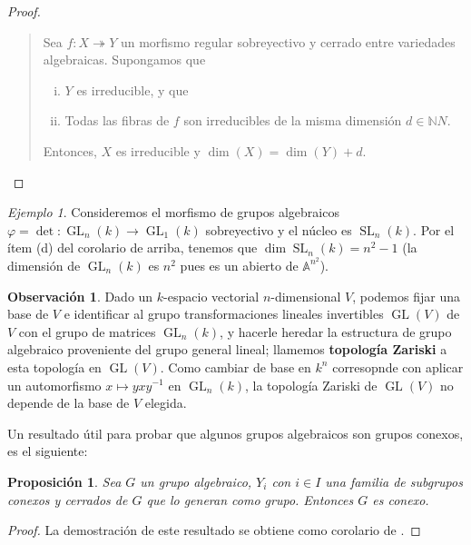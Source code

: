 \documentclass[spanish,10pt]{amsart}
\newtheorem{proposition}[theorem]{Proposición}
\theoremstyle{definition}
\newtheorem{obs}[theorem]{Observación}
\theoremstyle{remark}
\newtheorem{example}[theorem]{Ejemplo}
\numberwithin{equation}{section}
\newcommand{\afine}[1]{\mathbb{A}^{#1}}
\newcommand{\naturals}{\mathbb{N}}
\begin{document}
\begin{proof}
\begin{enumerate}[(a)]
\begin{quote}
Sea $f : X \twoheadrightarrow Y$ un morfismo regular sobreyectivo y cerrado entre variedades algebraicas. Supongamos que
\begin{enumerate}[(i)]
\item $Y$ es irreducible, y que
\item Todas las fibras de $f$ son irreducibles de la misma dimensión $d \in \naturals N$.
\end{enumerate}
Entonces, $X$ es irreducible y $\dim (X) = \dim (Y) + d$.
\end{quote}
\end{enumerate}
\end{proof}

\begin{example}
Consideremos el morfismo de grupos algebraicos $\varphi = \det : \operatorname{GL}_n (k) \to \operatorname{GL}_{1} (k)$ sobreyectivo y el núcleo es $\operatorname{SL}_n (k)$. Por el ítem (d) del corolario de arriba, tenemos que $\dim \operatorname{SL}_n (k) = n^2 -1$ (la dimensión de $\operatorname{GL}_n (k)$ es $n^2$ pues es un abierto de $\afine{n^2}$).
\end{example}

\begin{obs}
Dado un $k$-espacio vectorial $n$-dimensional $V$, podemos fijar una base de $V$ e identificar al grupo transformaciones lineales invertibles $\operatorname{GL} (V)$ de $V$ con el grupo de matrices $\operatorname{GL}_n (k)$, y hacerle heredar la estructura de grupo algebraico proveniente del grupo general lineal; llamemos \textbf{topología Zariski} a esta topología en $\operatorname{GL}(V)$. Como cambiar de base en $k^n$ corresopnde con aplicar un automorfismo $x \mapsto y x y^{-1}$ en $\operatorname{GL}_n (k)$, la topología Zariski de $\operatorname{GL} (V)$ no depende de la base de $V$ elegida.
\end{obs}

Un resultado útil para probar que algunos grupos algebraicos son grupos conexos, es el siguiente:
\begin{proposition}
Sea $G$ un grupo algebraico, $Y_i $ con $i \in I$ una familia de subgrupos conexos y cerrados de $G$ que lo generan como grupo. Entonces $G$ es conexo.
\end{proposition}
\begin{proof}
La demostración de este resultado se obtiene como corolario de \cite[Proposición \S 7.5.]{humphreys2012linearAlgebraicGroups}.
\end{proof}
\end{document}
